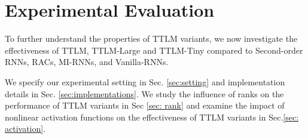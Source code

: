 \section{Experimental Evaluation} 
\label{sec: experiments}

To further understand the properties of TTLM variants, we now investigate the effectiveness of TTLM, TTLM-Large and TTLM-Tiny compared to Second-order RNNs, RACs, MI-RNNs, and Vanilla-RNNs. 


We specify our  experimental setting in Sec. \ref{sec:setting} and implementation details in Sec. \ref{sec:implementations}. We study the influence of ranks on the performance of TTLM variants in Sec \ref{sec: rank} and examine the impact of nonlinear activation functions on the effectiveness of TTLM variants in Sec.\ref{sec: activation}. 



